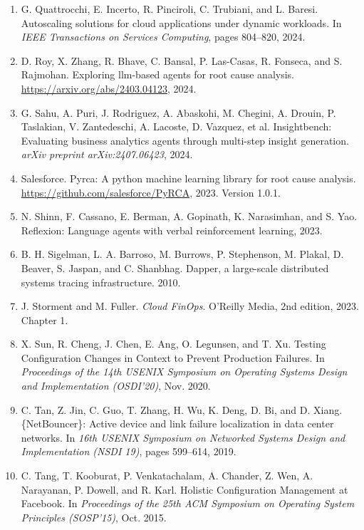 \begin{enumerate}[leftmargin=2em,itemsep=2pt]
\item G. Quattrocchi, E. Incerto, R. Pinciroli, C. Trubiani, and L. Baresi. Autoscaling solutions for cloud applications under dynamic workloads. In \textit{IEEE Transactions on Services Computing}, pages 804--820, 2024.

\item D. Roy, X. Zhang, R. Bhave, C. Bansal, P. Las-Casas, R. Fonseca, and S. Rajmohan. Exploring llm-based agents for root cause analysis. \url{https://arxiv.org/abs/2403.04123}, 2024.

\item G. Sahu, A. Puri, J. Rodriguez, A. Abaskohi, M. Chegini, A. Drouin, P. Taslakian, V. Zantedeschi, A. Lacoste, D. Vazquez, et al. Insightbench: Evaluating business analytics agents through multi-step insight generation. \textit{arXiv preprint arXiv:2407.06423}, 2024.

\item Salesforce. Pyrca: A python machine learning library for root cause analysis. \url{https://github.com/salesforce/PyRCA}, 2023. Version 1.0.1.

\item N. Shinn, F. Cassano, E. Berman, A. Gopinath, K. Narasimhan, and S. Yao. Reflexion: Language agents with verbal reinforcement learning, 2023.

\item B. H. Sigelman, L. A. Barroso, M. Burrows, P. Stephenson, M. Plakal, D. Beaver, S. Jaspan, and C. Shanbhag. Dapper, a large-scale distributed systems tracing infrastructure. 2010.

\item J. Storment and M. Fuller. \textit{Cloud FinOps}. O'Reilly Media, 2nd edition, 2023. Chapter 1.

\item X. Sun, R. Cheng, J. Chen, E. Ang, O. Legunsen, and T. Xu. Testing Configuration Changes in Context to Prevent Production Failures. In \textit{Proceedings of the 14th USENIX Symposium on Operating Systems Design and Implementation (OSDI'20)}, Nov. 2020.

\item C. Tan, Z. Jin, C. Guo, T. Zhang, H. Wu, K. Deng, D. Bi, and D. Xiang. \{NetBouncer\}: Active device and link failure localization in data center networks. In \textit{16th USENIX Symposium on Networked Systems Design and Implementation (NSDI 19)}, pages 599--614, 2019.

\item C. Tang, T. Kooburat, P. Venkatachalam, A. Chander, Z. Wen, A. Narayanan, P. Dowell, and R. Karl. Holistic Configuration Management at Facebook. In \textit{Proceedings of the 25th ACM Symposium on Operating System Principles (SOSP'15)}, Oct. 2015.


\end{enumerate}
